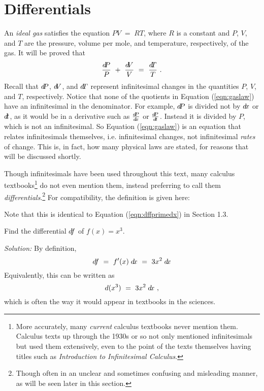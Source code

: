 \section{Differentials}
An \emph{ideal gas} satisfies the equation $PV \;=\; RT$,
where $R$ is a constant and $P$, $V$, and $T$ are the pressure, volume per
mole, and temperature, respectively, of the gas. It will be proved that
\begin{equation}\label{eqn:gaslaw}
 \dfrac{d\negmedspace P}{P} ~+~ \dfrac{d\negmedspace V}{V} ~=~ \dfrac{d\negmedspace T}{T} ~.
\end{equation}
Recall that $d\negmedspace P$, $d\negmedspace V$, and $d\negmedspace T$ represent infinitesimal changes in the
quantities $P$, $V$, and $T$, respectively. Notice that none of the quotients in
Equation (\ref{eqn:gaslaw}) have an infinitesimal in the denominator. For example,
$d\negmedspace P$ is divided not by $d\!x$ or $d\!t$, as it would be in a derivative such as
$\frac{d\negmedspace P}{d\!x}$ or $\frac{d\negmedspace P}{d\!t}$. Instead it is divided by $P$, which is not
an infinitesimal. So Equation (\ref{eqn:gaslaw}) is an equation that relates
infinitesimals themselves, i.e. infinitesimal changes, not infinitesimal
\emph{rates} of change. This is, in fact, how many physical laws are stated, for
reasons that will be discussed shortly.

Though infinitesimals have been used
throughout this text, many calculus textbooks\footnote{More accurately, many
\emph{current} calculus textbooks never mention them. Calculus texts up through
the 1930s or so not only mentioned infinitesimals but used them extensively,
even to the point of the texts themselves having titles such as \emph{Introduction
to Infinitesimal Calculus}.} do not even mention them, instead preferring to call
them \emph{differentials}.\footnote{Though often in an unclear and sometimes
confusing and misleading manner, as will be seen later in this section.} For
compatibility, the definition is given here:

Note that this is identical to Equation (\ref{eqn:dffprimedx}) in Section 1.3.

\begin{exmp}\label{exmp:diff1}
\noindent Find the differential $d\negmedspace f$ of $f(x) = x^3$.\vspace{1mm}
\par\noindent\emph{Solution:} By definition,
\[
d\negmedspace f ~=~ f'(x)\;d\!x ~=~ 3x^2\;d\!x
\]
Equivalently, this can be written as
\[
d(x^3) ~=~ 3x^2\;d\!x ~,
\]
which is often the way it would appear in textbooks in the sciences.
\end{exmp}
\divider
\vspace{3mm}

